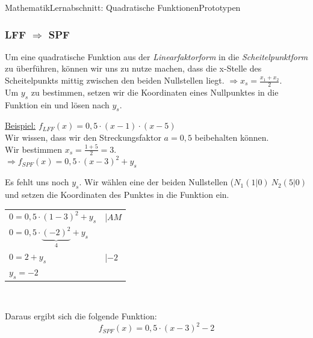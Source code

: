 \documentclass[11pt,twocolumn,oneside,openany,headings=optiontotoc,11pt,numbers=noenddot]{article}
\begin{document}
\begin{worksheet}{Mathematik}{Lernabschnitt: Quadratische Funktionen}{Prototypen}
		\subsubsection*{LFF \(\Rightarrow\) SPF}
		Um eine quadratische Funktion aus der \textit{Linearfaktorform} in die \textit{Scheitelpunktform} zu überführen, können wir uns zu nutze machen, dass die x-Stelle des Scheitelpunkts mittig zwischen den beiden Nullstellen liegt. \(\Rightarrow x_s = \frac{x_1+x_2}{2}\).\\
		Um \(y_s\) zu bestimmen, setzen wir die Koordinaten eines Nullpunktes in die Funktion ein und lösen nach \(y_s\).\\
		\par\noindent
		\underline{Beispiel:} \(f_{LFF}(x) = 0,5\cdot(x-1)\cdot(x-5)\)\\
		Wir wissen, dass wir den Streckungsfaktor \(a = 0,5\) beibehalten können.\\
		Wir bestimmen \(x_s = \frac{1+5}{2} = 3\).\\
		\(\Rightarrow f_{SPF}(x) = 0,5\cdot(x-3)^2 + y_s\)\\
		\par\noindent
		Es fehlt uns noch \(y_s\). Wir wählen eine der beiden Nullstellen (\(N_1(1|0)\ N_2(5|0)\) und setzen die Koordinaten des Punktes in die Funktion ein.\\
		\par\noindent
		\begin{tabularx}{0.5\textwidth}{ll}
			\(0 = 0,5\cdot(1-3)^2 + y_s\) & |\(AM\)\\
			\(0 = 0,5\cdot\underbrace{(-2)^2}_{4} + y_s\)\\
			\(0 = 2 +y_s\) & |\(-2\)\\
			\(y_s = -2\)
		\end{tabularx}\\
		\par\noindent
		Daraus ergibt sich die folgende Funktion: \[f_{SPF}(x) = 0,5\cdot(x-3)^2-2\]

\end{worksheet}
\end{document}

